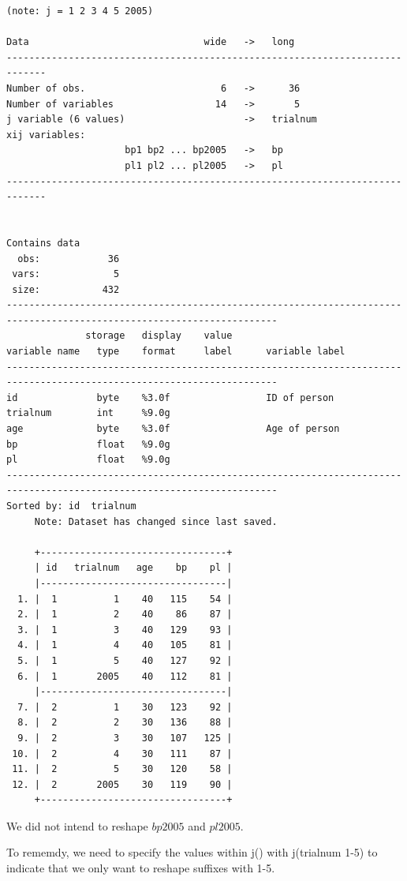 \documentclass[
]{book}
\begin{document}
\begin{verbatim}
(note: j = 1 2 3 4 5 2005)

Data                               wide   ->   long
-----------------------------------------------------------------------------
Number of obs.                        6   ->      36
Number of variables                  14   ->       5
j variable (6 values)                     ->   trialnum
xij variables:
                     bp1 bp2 ... bp2005   ->   bp
                     pl1 pl2 ... pl2005   ->   pl
-----------------------------------------------------------------------------


Contains data
  obs:            36                          
 vars:             5                          
 size:           432                          
----------------------------------------------------------------------------------------------------------------------
              storage   display    value
variable name   type    format     label      variable label
----------------------------------------------------------------------------------------------------------------------
id              byte    %3.0f                 ID of person
trialnum        int     %9.0g                 
age             byte    %3.0f                 Age of person
bp              float   %9.0g                 
pl              float   %9.0g                 
----------------------------------------------------------------------------------------------------------------------
Sorted by: id  trialnum
     Note: Dataset has changed since last saved.

     +---------------------------------+
     | id   trialnum   age    bp    pl |
     |---------------------------------|
  1. |  1          1    40   115    54 |
  2. |  1          2    40    86    87 |
  3. |  1          3    40   129    93 |
  4. |  1          4    40   105    81 |
  5. |  1          5    40   127    92 |
  6. |  1       2005    40   112    81 |
     |---------------------------------|
  7. |  2          1    30   123    92 |
  8. |  2          2    30   136    88 |
  9. |  2          3    30   107   125 |
 10. |  2          4    30   111    87 |
 11. |  2          5    30   120    58 |
 12. |  2       2005    30   119    90 |
     +---------------------------------+
\end{verbatim}

We did not intend to reshape \(bp2005\) and \(pl2005\).

To rememdy, we need to specify the values within j() with j(trialnum 1-5) to indicate that we only want to reshape suffixes with 1-5.
\end{document}
